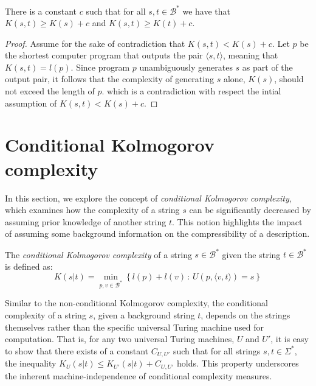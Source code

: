 \begin{proposition}
\label{prop:excess_kolmogorov}
There is a constant $c$ such that for all $s, t \in \mathcal{B}^{\ast}$ we have that $K(s, t) \geq K(s) + c$ and $K(s, t) \geq K(t) + c$.
\end{proposition}
\begin{proof}
Assume for the sake of contradiction that $K(s, t) < K(s) + c$. Let $p$ be the shortest computer program that outputs the pair $\langle s, t \rangle$, meaning that $K(s, t) = l(p)$. Since program $p$ unambiguously generates $s$ as part of the output pair, it follows that the complexity of generating $s$ alone, $K(s)$, should not exceed the length of $p$. which is a contradiction with respect the intial assumption of $K(s, t) < K(s) + c$. 
\end{proof}


%
%

\section{Conditional Kolmogorov complexity}

In this section, we explore the concept of \emph{conditional Kolmogorov complexity}, which examines how the complexity of a string $s$ can be significantly decreased by assuming prior knowledge of another string $t$. This notion highlights the impact of assuming some background information on the compressibility of a description.

\begin{definition}
The \emph{conditional Kolmogorov complexity} of a string $s \in \mathcal{B}^{\ast}$ given the string $t \in \mathcal{B}^{\ast}$ is defined as:
\[
K(s|t)=\min_{p, v \in \mathcal{B}^{\ast}}\left\{l(p) + l(v)\,:\, U(p,\langle v, t \rangle)=s\right\}
\]
\end{definition}

Similar to the non-conditional Kolmogorov complexity, the conditional complexity of a string $s$, given a background string $t$, depends on the strings themselves rather than the specific universal Turing machine used for computation. That is, for any two universal Turing machines, $U$ and $U'$, it is easy to show that there exists of a constant $C_{U, U'}$ such that for all strings $s, t \in \Sigma^{\ast}$, the inequality $K_{U}(s|t) \leq K_{U'}(s|t) + C_{U, U'}$ holds. This property underscores the inherent machine-independence of conditional complexity measures.

